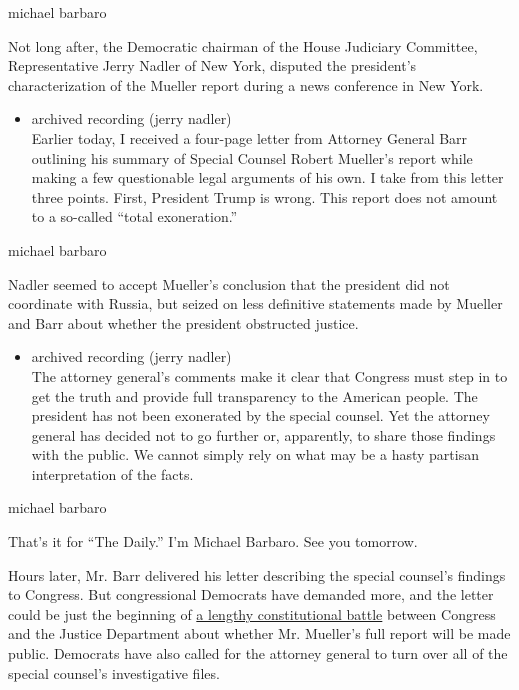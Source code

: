 michael barbaro

Not long after, the Democratic chairman of the House Judiciary
Committee, Representative Jerry Nadler of New York, disputed the
president's characterization of the Mueller report during a news
conference in New York.

\begin{itemize}
\tightlist
\item
  archived recording (jerry nadler)\\
  Earlier today, I received a four-page letter from Attorney General
  Barr outlining his summary of Special Counsel Robert Mueller's report
  while making a few questionable legal arguments of his own. I take
  from this letter three points. First, President Trump is wrong. This
  report does not amount to a so-called ``total exoneration.''
\end{itemize}

michael barbaro

Nadler seemed to accept Mueller's conclusion that the president did not
coordinate with Russia, but seized on less definitive statements made by
Mueller and Barr about whether the president obstructed justice.

\begin{itemize}
\tightlist
\item
  archived recording (jerry nadler)\\
  The attorney general's comments make it clear that Congress must step
  in to get the truth and provide full transparency to the American
  people. The president has not been exonerated by the special counsel.
  Yet the attorney general has decided not to go further or, apparently,
  to share those findings with the public. We cannot simply rely on what
  may be a hasty partisan interpretation of the facts.
\end{itemize}

michael barbaro

That's it for ``The Daily.'' I'm Michael Barbaro. See you tomorrow.

Hours later, Mr. Barr delivered his letter describing the special
counsel's findings to Congress. But congressional Democrats have
demanded more, and the letter could be just the beginning of
\href{https://www.nytimes.com/2019/03/22/us/politics/executive-privilege-mueller.html}{a
lengthy constitutional battle} between Congress and the Justice
Department about whether Mr. Mueller's full report will be made public.
Democrats have also called for the attorney general to turn over all of
the special counsel's investigative files.


